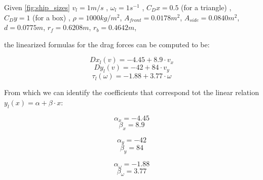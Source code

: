 Given \vref{fig:ship_sizes}
 $ v_{l} = 1m/s $ ,
 $ \omega_{l} = 1 s ^{-1} $ ,
 $ C_{D}x = 0.5 $ (for a triangle) ,
 $ C_{D}y = 1 $ (for a box) ,
 $ \rho = 1000 kg/m ^{2} $,
 $ A_{front} = 0.0178 m^{2} $,
 $ A_{side} = 0.0840 m ^{2} $,
 $ d = 0.0775 m $,
 $ r_{f} = 0.6208 m $,
 $ r_{b} = 0.4642 m $,
 
the linearized formulas for the drag forces can be computed to be:

\[ Dx_{l}(v) = -4.45 + 8.9 \cdot v_{x} \]
\[ Dy_{l}(v) = -42 + 84 \cdot v_{y} \]
\[ \tau_{l}(\omega) = -1.88 + 3.77 \cdot \omega \]

From which we can identify the coefficients that correspond tot the linear relation $ y_{l}(x) = \alpha + \beta \cdot x $:\\
\begin{minipage}{0.3\linewidth}	
\[ \alpha_{x} = -4.45 \] 
\[ \beta_{x} = 8.9 \]
\end{minipage}
\begin{minipage}{0.3\linewidth}	
\[ \alpha_{y} = -42 \] 
\[ \beta_{y} = 84 \]
\end{minipage}
\begin{minipage}{0.3\linewidth}
\[ \alpha_{\omega} = -1.88 \]
\[ \beta_{\omega} = 3.77 \]
\end{minipage}



